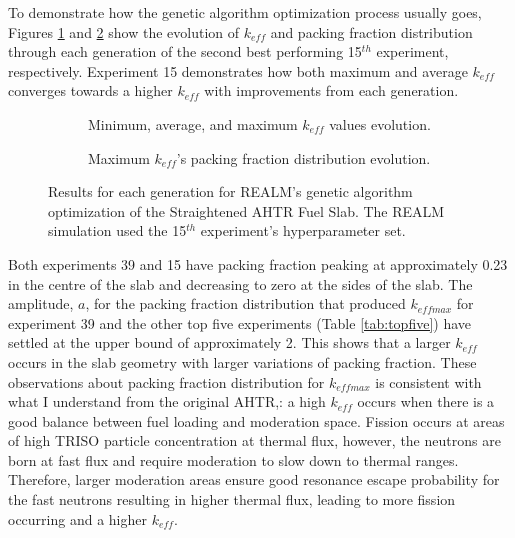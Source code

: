 To demonstrate how the genetic algorithm optimization process usually goes, 
Figures \ref{fig:keff_conv_15} and \ref{fig:pf_15} show the evolution of $k_{eff}$ 
and packing fraction distribution through each generation of the second best 
performing 15$^{th}$ experiment, respectively. 
Experiment 15 demonstrates how both maximum and average $k_{eff}$ converges 
towards a higher $k_{eff}$ with improvements from each generation.
\begin{figure}[]
    \centering
    \begin{subfigure}{\textwidth}
    \caption{Minimum, average, and maximum $k_{eff}$ values evolution.}
    \label{fig:keff_conv_15}
    \end{subfigure}
    \begin{subfigure}{\textwidth}
        \caption{Maximum $k_{eff}$'s packing fraction distribution evolution.}
        \label{fig:pf_15}
    \end{subfigure}
    \caption{ Results for each generation for REALM's genetic algorithm optimization 
    of the Straightened \acrfull{AHTR} Fuel Slab. The REALM simulation used 
    the 15$^{th}$ experiment's hyperparameter set.}
    \label{fig:15}
\end{figure}

Both experiments 39 and 15 have packing fraction peaking at approximately 
0.23 in the centre of the slab and decreasing to zero at the sides of the slab.  
The amplitude, $a$, for the packing fraction distribution that produced $k_{eff max}$ 
for experiment 39 and the other top five experiments (Table \ref{tab:topfive}) 
have settled at the upper bound of approximately 2. 
This shows that a larger $k_{eff}$ occurs in the slab geometry with larger 
variations of packing fraction. 
These observations about packing fraction distribution for $k_{eff max}$ is 
consistent with what I understand from the original \gls{AHTR},: a high $k_{eff}$ 
occurs when there is a good balance between fuel loading and moderation space. 
Fission occurs at areas of high \gls{TRISO} particle concentration at thermal flux, 
however, the neutrons are born at fast flux and require moderation to slow down 
to thermal ranges.
Therefore, larger moderation areas ensure good resonance escape probability for 
the fast neutrons resulting in higher thermal flux, leading to more 
fission occurring and a higher $k_{eff}$. 

